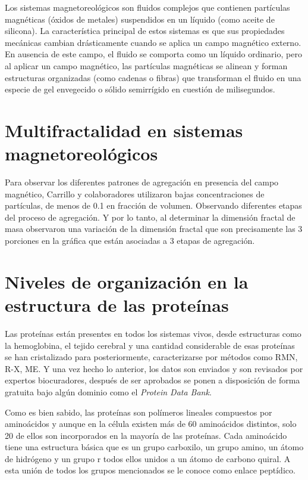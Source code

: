 Los sistemas magnetoreol\'{o}gicos son fluidos complejos que contienen part\'{i}culas magn\'{e}ticas (\'{o}xidos de metales) suspendidos en un l\'{i}quido (como aceite de silicona). La caracter\'{i}stica principal de estos sistemas es que sus propiedades mec\'{a}nicas cambian dr\'{a}sticamente cuando se aplica un campo magn\'{e}tico externo. En ausencia de este campo, el ﬂuido se comporta como un l\'{i}quido ordinario, pero al aplicar un campo magn\'{e}tico, las part\'{i}culas magn\'{e}ticas se alinean y forman estructuras organizadas (como cadenas o ﬁbras) que transforman el ﬂuido en una especie de gel envegecido o s\'{o}lido semirr\'{i}gido en cuesti\'{o}n de milisegundos. 


\section{Multifractalidad en sistemas magnetoreol\'{o}gicos}

Para observar los diferentes patrones de agregaci\'{o}n en presencia del campo magn\'{e}tico, Carrillo y colaboradores utilizaron bajas concentraciones de part\'{i}culas, de menos de 0.1 en fracci\'{o}n de volumen. Observando diferentes etapas del proceso de agregaci\'{o}n. Y por lo tanto, al determinar la dimensi\'{o}n fractal de masa observaron una variaci\'{o}n de la dimensi\'{o}n fractal que son precisamente las 3 porciones en la gr\'{a}ﬁca que est\'{a}n asociadas a 3 etapas de agregaci\'{o}n.
 
 
 
\section{Niveles de organizaci\'{o}n en la estructura de las prote\'{i}nas}


Las prote\'{i}nas est\'{a}n presentes en todos los sistemas vivos, desde estructuras como la hemoglobina, el tejido cerebral y una cantidad considerable de esas prote\'{i}nas se han cristalizado para
posteriormente, caracterizarse por m\'{e}todos como RMN, R-X, ME. Y una vez hecho lo anterior, los datos son enviados y son revisados por expertos biocuradores, despu\'{e}s de
ser aprobados se ponen a disposici\'{o}n de forma gratuita bajo algún dominio como el \textit{Protein Data Bank}.


Como es bien sabido, las prote\'{i}nas son pol\'{i}meros lineales compuestos por amino\'{a}cidos y aunque en la
c\'{e}lula existen m\'{a}s de 60 amino\'{a}cidos distintos, solo 20 de ellos son incorporados en la mayor\'{i}a de las
prote\'{i}nas.
Cada amino\'{a}cido tiene una estructura b\'{a}sica que es un grupo carboxilo, un grupo amino, un \'{a}tomo de
hidr\'{o}geno y un grupo r todos ellos unidos a un \'{a}tomo de carbono quiral. A esta uni\'{o}n de todos los grupos
mencionados se le conoce como enlace pept\'{i}dico.

